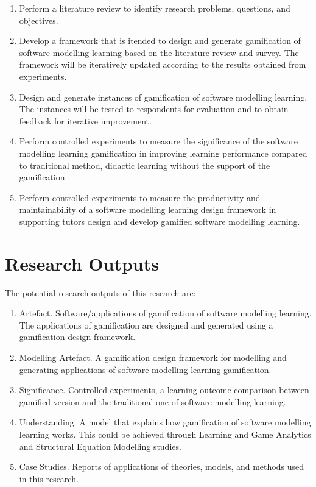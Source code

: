 \documentclass[12pt, a4paper]{report}
\begin{document}
{\begin{enumerate}
\item Perform a literature review to identify research problems, questions, and objectives. 
\item Develop a framework that is itended to design and generate gamification of software modelling learning based on the literature review and survey. The framework will be iteratively updated according to the results obtained from experiments. 
\item Design and generate instances of gamification of software modelling learning. The instances will be tested to respondents for evaluation and to obtain feedback for iterative improvement. 
\item Perform controlled experiments to measure the significance of the software modelling learning gamification in improving learning performance compared to traditional method, didactic learning without the support of the gamification.
\item Perform controlled experiments to measure the productivity and maintainability of a software modelling learning design framework in supporting tutors design and develop gamified software modelling learning. 
\end{enumerate}

\section{Research Outputs}
The potential research outputs of this research are:
\begin{enumerate}
\item Artefact. Software/applications of gamification of software modelling learning. The applications of gamification are designed and generated using a gamification design framework. 
\item Modelling Artefact. A gamification design framework for modelling and generating applications of software modelling learning gamification.
\item Significance. Controlled experiments, a learning outcome comparison between gamified version and the traditional one of software modelling learning.
\item Understanding. A model that explains how gamification of software modelling learning works. This could be achieved through Learning and Game Analytics and Structural Equation Modelling studies.
\item Case Studies. Reports of applications of theories, models, and methods used in this research.
\end{enumerate}

}
\end{document}
